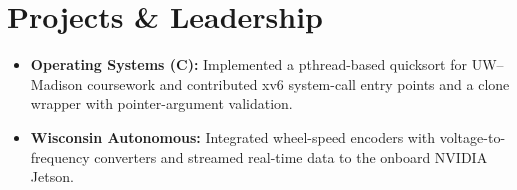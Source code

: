 \documentclass[11pt, letterpaper]{article}
\begin{document}
\section{Projects \& Leadership}
\begin{itemize}
  \item \textbf{Operating Systems (C):} Implemented a pthread-based quicksort for UW--Madison coursework and contributed xv6 system-call entry points and a clone wrapper with pointer-argument validation.
  \item \textbf{Wisconsin Autonomous:} Integrated wheel-speed encoders with voltage-to-frequency converters and streamed real-time data to the onboard NVIDIA Jetson.
\end{itemize}
\end{document}
